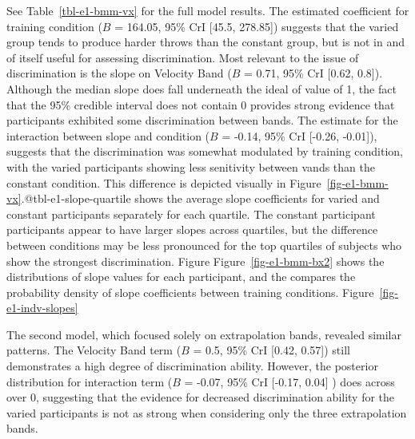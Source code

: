 \documentclass[
  letterpaper,
  DIV=11,
  numbers=noendperiod,
  oneside]{scrartcl}
\begin{document}
See Table~\ref{tbl-e1-bmm-vx} for the full model results. The estimated
coefficient for training condition (\(B\) = 164.05, 95\% CrI {[}45.5,
278.85{]}) suggests that the varied group tends to produce harder throws
than the constant group, but is not in and of itself useful for
assessing discrimination. Most relevant to the issue of discrimination
is the slope on Velocity Band (\(B\) = 0.71, 95\% CrI {[}0.62, 0.8{]}).
Although the median slope does fall underneath the ideal of value of 1,
the fact that the 95\% credible interval does not contain 0 provides
strong evidence that participants exhibited some discrimination between
bands. The estimate for the interaction between slope and condition
(\(B\) = -0.14, 95\% CrI {[}-0.26, -0.01{]}), suggests that the
discrimination was somewhat modulated by training condition, with the
varied participants showing less senitivity between vands than the
constant condition. This difference is depicted visually in
Figure~\ref{fig-e1-bmm-vx}.@tbl-e1-slope-quartile shows the average
slope coefficients for varied and constant participants separately for
each quartile. The constant participant participants appear to have
larger slopes across quartiles, but the difference between conditions
may be less pronounced for the top quartiles of subjects who show the
strongest discrimination. Figure Figure~\ref{fig-e1-bmm-bx2} shows the
distributions of slope values for each participant, and the compares the
probability density of slope coefficients between training conditions.
Figure~\ref{fig-e1-indv-slopes}

The second model, which focused solely on extrapolation bands, revealed
similar patterns. The Velocity Band term (\(B\) = 0.5, 95\% CrI {[}0.42,
0.57{]}) still demonstrates a high degree of discrimination ability.
However, the posterior distribution for interaction term (\(B\) = -0.07,
95\% CrI {[}-0.17, 0.04{]} ) does across over 0, suggesting that the
evidence for decreased discrimination ability for the varied
participants is not as strong when considering only the three
extrapolation bands.
\end{document}
